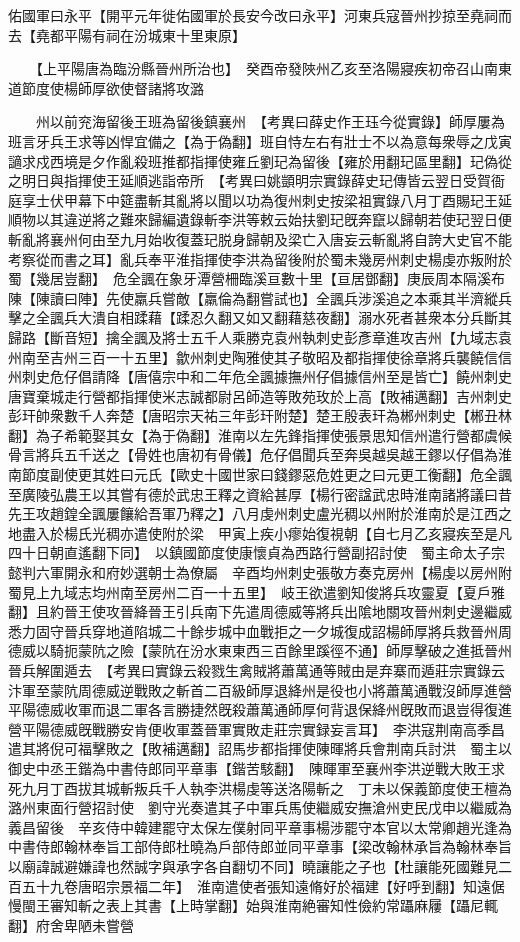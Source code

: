 佑國軍曰永平【開平元年徙佑國軍於長安今改曰永平】河東兵寇晉州抄掠至堯祠而去【堯都平陽有祠在汾城東十里東原】

　　【上平陽唐為臨汾縣晉州所治也】　癸酉帝發陜州乙亥至洛陽寢疾初帝召山南東道節度使楊師厚欲使督諸將攻潞

　　州以前兖海留後王班為留後鎮襄州　【考異曰薛史作王珏今從實錄】師厚屢為班言牙兵王求等凶悍宜備之【為于偽翻】班自恃左右有壯士不以為意每衆辱之戊寅讁求戍西境是夕作亂殺班推都指揮使雍丘劉玘為留後【雍於用翻玘區里翻】玘偽從之明日與指揮使王延順逃詣帝所　【考異曰姚顗明宗實錄薛史玘傳皆云翌日受賀衙庭享士伏甲幕下中筵盡斬其亂將以聞以功為復州刺史按梁祖實錄八月丁酉賜玘王延順物以其違逆將之難來歸編遺錄斬李洪等敕云始扶劉玘旣奔竄以歸朝若使玘翌日便斬亂將襄州何由至九月始收復蓋玘脱身歸朝及梁亡入唐妄云斬亂將自誇大史官不能考察從而書之耳】亂兵奉平淮指揮使李洪為留後附於蜀未幾房州刺史楊虔亦叛附於蜀【幾居豈翻】　危全諷在象牙潭營柵臨溪亘數十里【亘居鄧翻】庚辰周本隔溪布陳【陳讀曰陣】先使羸兵嘗敵【羸倫為翻嘗試也】全諷兵涉溪追之本乘其半濟縱兵擊之全諷兵大潰自相蹂藉【蹂忍久翻又如又翻藉慈夜翻】溺水死者甚衆本分兵斷其歸路【斷音短】擒全諷及將士五千人乘勝克袁州執刺史彭彥章進攻吉州【九域志袁州南至吉州三百一十五里】歙州刺史陶雅使其子敬昭及都指揮使徐章將兵襲饒信信州刺史危仔倡請降【唐僖宗中和二年危全諷據撫州仔倡據信州至是皆亡】饒州刺史唐寶棄城走行營都指揮使米志誠都尉呂師造等敗苑玫於上高【敗補邁翻】吉州刺史彭玕帥衆數千人奔楚【唐昭宗天祐三年彭玕附楚】楚王殷表玕為郴州刺史【郴丑林翻】為子希範娶其女【為于偽翻】淮南以左先鋒指揮使張景思知信州遣行營都虞候骨言將兵五千送之【骨姓也唐初有骨儀】危仔倡聞兵至奔吳越吳越王鏐以仔倡為淮南節度副使更其姓曰元氏【歐史十國世家曰錢鏐惡危姓更之曰元更工衡翻】危全諷至廣陵弘農王以其嘗有德於武忠王釋之資給甚厚【楊行密諡武忠時淮南諸將議曰昔先王攻趙鍠全諷屢饟給吾軍乃釋之】八月虔州刺史盧光稠以州附於淮南於是江西之地盡入於楊氏光稠亦遣使附於梁　甲寅上疾小瘳始復視朝【自七月乙亥寢疾至是凡四十日朝直遙翻下同】　以鎮國節度使康懷貞為西路行營副招討使　蜀主命太子宗懿判六軍開永和府妙選朝士為僚屬　辛酉均州刺史張敬方奏克房州【楊虔以房州附蜀見上九域志均州南至房州二百一十五里】　岐王欲遣劉知俊將兵攻靈夏【夏戶雅翻】且約晉王使攻晉絳晉王引兵南下先遣周德威等將兵出隂地關攻晉州刺史邊繼威悉力固守晉兵穿地道陷城二十餘步城中血戰拒之一夕城復成詔楊師厚將兵救晉州周德威以騎扼蒙阬之險【蒙阬在汾水東東西三百餘里蹊徑不通】師厚擊破之進抵晉州晉兵解圍遁去　【考異曰實錄云殺戮生禽賊將蕭萬通等賊由是弃寨而遁莊宗實錄云汴軍至蒙阬周德威逆戰敗之斬首二百級師厚退絳州是役也小將蕭萬通戰沒師厚進營平陽德威收軍而退二軍各言勝捷然旣殺蕭萬通師厚何背退保絳州旣敗而退豈得復進營平陽德威旣戰勝安肯便收軍蓋晉軍實敗走莊宗實録妄言耳】　李洪寇荆南高季昌遣其將倪可福擊敗之【敗補邁翻】詔馬步都指揮使陳暉將兵會荆南兵討洪　蜀主以御史中丞王鍇為中書侍郎同平章事【鍇苦駭翻】　陳暉軍至襄州李洪逆戰大敗王求死九月丁酉拔其城斬叛兵千人執李洪楊虔等送洛陽斬之　丁未以保義節度使王檀為潞州東面行營招討使　劉守光奏遣其子中軍兵馬使繼威安撫滄州吏民戊申以繼威為義昌留後　辛亥侍中韓建罷守太保左僕射同平章事楊涉罷守本官以太常卿趙光逢為中書侍郎翰林奉旨工部侍郎杜曉為戶部侍郎並同平章事【梁改翰林承旨為翰林奉旨以廟諱誠避嫌諱也然誠字與承字各自翻切不同】曉讓能之子也【杜讓能死國難見二百五十九卷唐昭宗景福二年】　淮南遣使者張知遠脩好於福建【好呼到翻】知遠倨慢閩王審知斬之表上其書【上時掌翻】始與淮南絶審知性儉約常躡麻屨【躡尼輒翻】府舍卑陋未嘗營